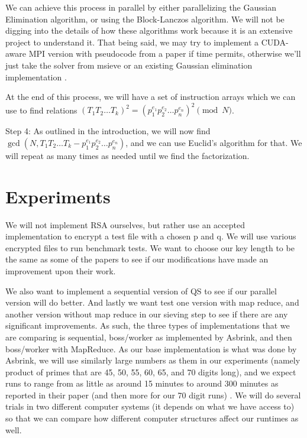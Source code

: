 \documentclass[11pt,twocolumn]{article}
\begin{document}
We can achieve this process in parallel by either parallelizing the Gaussian Elimination algorithm, or using the Block-Lanczos algorithm. We will not be digging into the details of how these algorithms work because it is an extensive project to understand it. That being said, we may try to implement a CUDA-aware MPI version with pseudocode from a paper if time permits, otherwise we'll just take the solver from msieve \cite{papadopoulos:msieve} or an existing Gaussian elimination implementation \cite{cohen:gaussian}.

At the end of this process, we will have a set of instruction arrays which we can use to find relations $(T_1 T_2 \ldots T_k)^2 = (p_1^{e_1} p_2^{e_2} \ldots p_n^{e_n})^2 \pmod{N}$.

Step 4: As outlined in the introduction, we will now find $\gcd(N, T_1 T_2 \ldots T_k - p_1^{e_1} p_2^{e_2} \ldots p_n^{e_n})$, and we can use Euclid's algorithm for that. We will repeat as many times as needed until we find the factorization.


\section {Experiments}\label{exper}
We will not implement RSA ourselves, but rather use an accepted implementation to encrypt a test file with a chosen p and q. We will use various encrypted files to run benchmark tests. We want to choose our key length to be the same as some of the papers to see if our modifications have made an improvement upon their work.

We also want to implement a sequential version of QS to see if our parallel version will do better. And lastly we want test one version with map reduce, and another version without map reduce in our sieving step to see if there are any significant improvements. As such, the three types of implementations that we are comparing is sequential, boss/worker as implemented by Asbrink, and then boss/worker with MapReduce. As our base implementation is what was done by Asbrink, we will use similarly large numbers as them in our experiments (namely product of primes that are 45, 50, 55, 60, 65, and 70 digits long), and we expect runs to range from as little as around 15 minutes to around 300 minutes as reported in their paper (and then more for our 70 digit runs) \cite{asbrink:parallelqs}. We will do several trials in two different computer systems (it depends on what we have access to) so that we can compare how different computer structures affect our runtimes as well.
\end{document}
